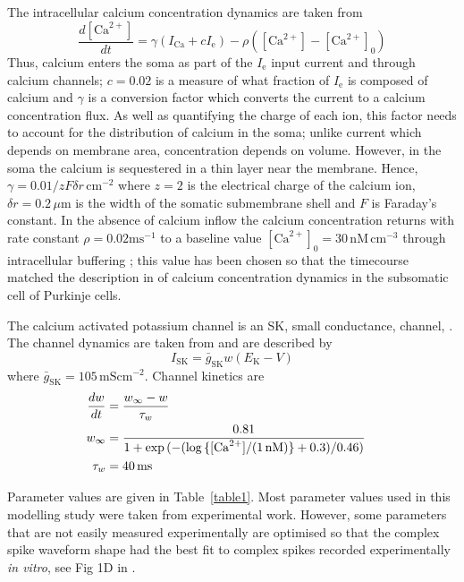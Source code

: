 \documentclass[utf8]{frontiersSCNS} %
\newcommand{\msi}{\,\mathrm{mS cm^{-2}}}
\newcommand{\mse}{\,\mathrm{ms}}
\newcommand{\cm}{\,\mathrm{cm}}
\renewcommand{\k}{\mathrm{K}}
\newcommand{\ca}{\mathrm{Ca}}
\newcommand{\sk}{\mathrm{SK}}
\begin{document}
The intracellular calcium concentration dynamics are taken from
\cite{SterrattEtAl2012,KochSegev1998}
\begin{equation}
\label{eq:ca_concentration}
\frac{d[\ca^{2+}]}{dt}=\gamma (I_\ca+cI_{\mathrm{e}})  -
\rho ([\ca^{2+}]-[\ca^{2+}]_0)
\end{equation}
Thus, calcium enters the soma as part of the $I_\mathrm{e}$ input
current and through calcium channels; $c=0.02$ is a measure of what
fraction of $I_{\mathrm{e}}$ is composed of calcium and $\gamma$ is a
conversion factor which converts the current to
a calcium concentration flux. As well as quantifying the charge of each
ion, this factor needs to account for the distribution of calcium in
the soma; unlike current which depends on membrane area, concentration
depends on volume. However, in the soma the calcium is sequestered in a
thin layer near the membrane. Hence,
$\gamma=0.01/zF\delta r\,\mathrm{cm}^{-2}$ where $z=2$ is the electrical
charge of the calcium ion, $\delta r=0.2\,\mu\mathrm{m}$ is the width of
the somatic submembrane shell and $F$ is Faraday's constant. In the
absence of calcium inflow the calcium concentration returns with rate
constant $\rho=0.02\mathrm{ms}^{-1}$ to a baseline value $[\ca^{2+}]_0
=30\,\mathrm{nM}\cm^{-3}$ through intracellular buffering
\cite{FierroEtAl1998,AiraksinenEtAl1997}; this value has been chosen
so that the timecourse matched the description in \cite{EilersEtAl1995} of
calcium concentration dynamics in the subsomatic cell of Purkinje
cells.

The calcium activated potassium channel is an SK, small conductance,
channel, \cite{LancasterEtAl1991}. The channel dynamics are taken from
\cite{GilliesWillshaw2006} and are described by
\begin{equation}
\label{eq:I_SK}
I_{\sk} = {\bar{g}_{\sk}}w(E_\k-V)
\end{equation}
where $\bar{g}_\sk = 105\msi$. Channel kinetics are
\begin{align}
\label{eq:w_kinetics}
\frac{dw}{dt} &= \frac{w_\infty- w}{\tau_w}\cr
w_{\infty}   &= \frac{0.81}{1 + \exp{(-(\log{\{[\ca^{2+}]/(1\,\mathrm{nM})\}}+0.3)/0.46)}}\cr
\tau_w &= 40 \mse
\end{align}

Parameter values are given in Table~\ref{table1}. Most parameter values used in this modelling study were taken from
experimental work. However, some parameters that are not easily
measured experimentally are optimised so that the complex spike
waveform shape had the best fit to complex spikes recorded
experimentally \textit{in vitro}, see Fig 1D in \cite{DavieEtAl2008}.
\end{document}
